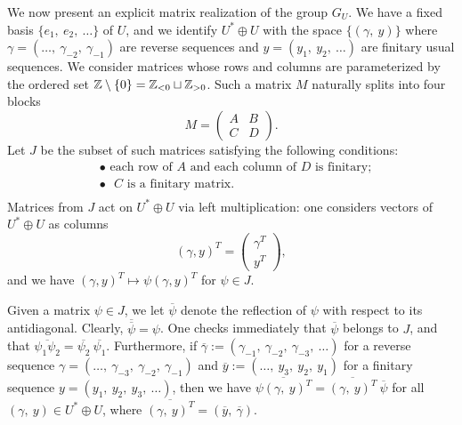 \documentclass[11pt, a4paper]{article}
\begin{document}
We now present an explicit matrix realization of the group $G_U$. 
We have a fixed basis 
$\{e_1,~e_2,~\ldots\}$ of $U$, 
and we identify 
$U^*\oplus U$ with the space $\{(\gamma,~y)\}$ where $\gamma=(\ldots,~\gamma_{-2},~\gamma_{-1})$ are  reverse sequences and $y=(y_{1},~y_2,~\ldots)$  are finitary usual sequences. %
We consider matrices whose rows and columns are parameterized by the ordered set $\mathbb{Z}\setminus \{0\}=\mathbb{Z}_{<0}\sqcup \mathbb{Z}_{>0}$. %
Such a matrix $M$ naturally splits into four blocks
\begin{equation*}
    M=\left(\begin{array}{c|c}
A & B  \\
\hline
C & D  \end{array}\right).
\end{equation*}
Let $J$ be the subset of such matrices satisfying the following conditions:
\begin{equation}
\begin{split}\label{formula:matrix_group}
&\text{$\bullet$ each row of $A$ and each column of $D$ is finitary};\\
&\text{$\bullet$ $C$ is a finitary matrix}.\\
\end{split}
\end{equation}
Matrices from $J$ act on $U^*\oplus U$ via left multiplication: one considers vectors of $U^*\oplus U$ as columns $$(\gamma,y)^{T}=\begin{pmatrix} \gamma^{T} \\ y^T \end{pmatrix},$$ and we have $(\gamma,y)^T \longmapsto \psi(\gamma,y)^{T}$
for $\psi\in J$.

Given a matrix $\psi\in J$, we let $\overline{\psi}$ denote the reflection of $\psi$ with respect to its antidiagonal.  
Clearly, $\overline{\overline{\psi}}=\psi$. One 
checks immediately that $\overline{\psi}$ belongs to $J$, and that $\overline{\psi_1\psi_2}=\overline{\psi_2}~\overline{\psi_1}$. Furthermore, if $\overline{\gamma}:=(\gamma_{-1},~\gamma_{-2},~\gamma_{-3},~\ldots)$ for a reverse sequence $\gamma=(\ldots,~\gamma_{-3},~\gamma_{-2},~\gamma_{-1})$ and $\overline{y}:=(\ldots,~y_3,~y_2,~y_1)$ for a finitary sequence $y=(y_1,~y_2,~y_3,~\ldots)$, then we have $\overline{\psi(\gamma,~y)^T}=\overline{(\gamma,~y)^T}~\overline{\psi}$ for all $(\gamma,~y)\in U^*\oplus U$, where $\overline{(\gamma,~y)^T}=(\overline{y},~\overline{\gamma})$.
\end{document}
